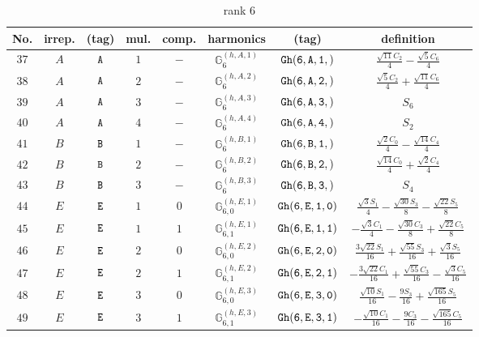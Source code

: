 \documentclass[fleqn,8pt]{jsarticle}
\begin{document}
\begin{table}[ht!]
\begin{center}
\caption{rank 6}
\renewcommand{\arraystretch}{1.3}
\begin{tabular}{cccccccc} \hline \hline
No. & irrep. & (tag) & mul. & comp. & harmonics & (tag) & definition \\ \hline
$ 37 $ & $ A $ & $ {\tt A} $ & $ 1 $ & $ - $ & $ \mathbb{G}_{6}^{(h,A,1)} $ & $ {\tt Gh(6,A,1,)} $ & $ \frac{\sqrt{11} C_{2}}{4} - \frac{\sqrt{5} C_{6}}{4} $ \\
$ 38 $ & $ A $ & $ {\tt A} $ & $ 2 $ & $ - $ & $ \mathbb{G}_{6}^{(h,A,2)} $ & $ {\tt Gh(6,A,2,)} $ & $ \frac{\sqrt{5} C_{2}}{4} + \frac{\sqrt{11} C_{6}}{4} $ \\
$ 39 $ & $ A $ & $ {\tt A} $ & $ 3 $ & $ - $ & $ \mathbb{G}_{6}^{(h,A,3)} $ & $ {\tt Gh(6,A,3,)} $ & $ S_{6} $ \\
$ 40 $ & $ A $ & $ {\tt A} $ & $ 4 $ & $ - $ & $ \mathbb{G}_{6}^{(h,A,4)} $ & $ {\tt Gh(6,A,4,)} $ & $ S_{2} $ \\
$ 41 $ & $ B $ & $ {\tt B} $ & $ 1 $ & $ - $ & $ \mathbb{G}_{6}^{(h,B,1)} $ & $ {\tt Gh(6,B,1,)} $ & $ \frac{\sqrt{2} C_{0}}{4} - \frac{\sqrt{14} C_{4}}{4} $ \\
$ 42 $ & $ B $ & $ {\tt B} $ & $ 2 $ & $ - $ & $ \mathbb{G}_{6}^{(h,B,2)} $ & $ {\tt Gh(6,B,2,)} $ & $ \frac{\sqrt{14} C_{0}}{4} + \frac{\sqrt{2} C_{4}}{4} $ \\
$ 43 $ & $ B $ & $ {\tt B} $ & $ 3 $ & $ - $ & $ \mathbb{G}_{6}^{(h,B,3)} $ & $ {\tt Gh(6,B,3,)} $ & $ S_{4} $ \\
$ 44 $ & $ E $ & $ {\tt E} $ & $ 1 $ & $ 0 $ & $ \mathbb{G}_{6,0}^{(h,E,1)} $ & $ {\tt Gh(6,E,1,0)} $ & $ \frac{\sqrt{3} S_{1}}{4} - \frac{\sqrt{30} S_{3}}{8} - \frac{\sqrt{22} S_{5}}{8} $ \\
$ 45 $ & $ E $ & $ {\tt E} $ & $ 1 $ & $ 1 $ & $ \mathbb{G}_{6,1}^{(h,E,1)} $ & $ {\tt Gh(6,E,1,1)} $ & $ - \frac{\sqrt{3} C_{1}}{4} - \frac{\sqrt{30} C_{3}}{8} + \frac{\sqrt{22} C_{5}}{8} $ \\
$ 46 $ & $ E $ & $ {\tt E} $ & $ 2 $ & $ 0 $ & $ \mathbb{G}_{6,0}^{(h,E,2)} $ & $ {\tt Gh(6,E,2,0)} $ & $ \frac{3 \sqrt{22} S_{1}}{16} + \frac{\sqrt{55} S_{3}}{16} + \frac{\sqrt{3} S_{5}}{16} $ \\
$ 47 $ & $ E $ & $ {\tt E} $ & $ 2 $ & $ 1 $ & $ \mathbb{G}_{6,1}^{(h,E,2)} $ & $ {\tt Gh(6,E,2,1)} $ & $ - \frac{3 \sqrt{22} C_{1}}{16} + \frac{\sqrt{55} C_{3}}{16} - \frac{\sqrt{3} C_{5}}{16} $ \\
$ 48 $ & $ E $ & $ {\tt E} $ & $ 3 $ & $ 0 $ & $ \mathbb{G}_{6,0}^{(h,E,3)} $ & $ {\tt Gh(6,E,3,0)} $ & $ \frac{\sqrt{10} S_{1}}{16} - \frac{9 S_{3}}{16} + \frac{\sqrt{165} S_{5}}{16} $ \\
$ 49 $ & $ E $ & $ {\tt E} $ & $ 3 $ & $ 1 $ & $ \mathbb{G}_{6,1}^{(h,E,3)} $ & $ {\tt Gh(6,E,3,1)} $ & $ - \frac{\sqrt{10} C_{1}}{16} - \frac{9 C_{3}}{16} - \frac{\sqrt{165} C_{5}}{16} $ \\
 \hline \hline
\end{tabular}
\end{center}
\end{table}
\end{document}
